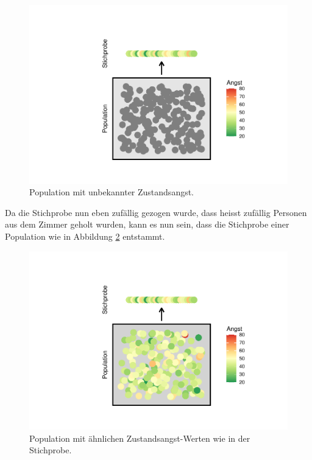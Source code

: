 \documentclass[
]{book}
\theoremstyle{definition}
\theoremstyle{definition}
\theoremstyle{definition}
\theoremstyle{definition}
\theoremstyle{remark}
\begin{document}
\begin{figure}
\centering
\includegraphics{aps_statistik1_files/figure-latex/srs-intervall-nocol-1.pdf}
\caption{\label{fig:srs-intervall-nocol}Population mit unbekannter Zustandsangst.}
\end{figure}

Da die Stichprobe nun eben zufällig gezogen wurde, dass heisst zufällig Personen aus dem Zimmer geholt wurden, kann es nun sein, dass die Stichprobe einer Population wie in Abbildung \ref{fig:srs-intervall-high-p} entstammt.

\begin{figure}
\centering
\includegraphics{aps_statistik1_files/figure-latex/srs-intervall-high-p-1.pdf}
\caption{\label{fig:srs-intervall-high-p}Population mit ähnlichen Zustandsangst-Werten wie in der Stichprobe.}
\end{figure}
\end{document}

